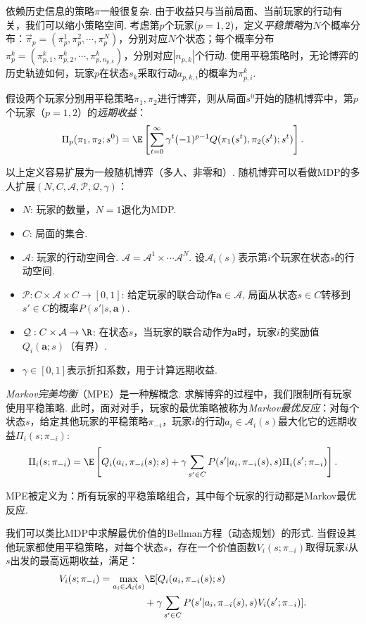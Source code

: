 依赖历史信息的策略$\pi$一般很复杂. 由于收益只与当前局面、当前玩家的行动有关，我们可以缩小策略空间. 考虑第$p$个玩家($p=1,2$)，定义\emph{平稳策略}为$N$个概率分布：$\vec \pi_p=(\pi_p^1,\pi_p^2,\cdots,\pi_p^N)$，分别对应$N$个状态；每个概率分布$\pi_p^k=(\pi_{p,1}^k,\pi_{p,2}^k,\cdots,\pi_{p,n_{p,k}}^k)$，分别对应$|n_{p,k}|$个行动. 使用平稳策略时，无论博弈的历史轨迹如何，玩家$p$在状态$s_k$采取行动$a_{p,k,i}$的概率为$\pi_{p,i}^k$.

假设两个玩家分别用平稳策略$\pi_1,\pi_2$进行博弈，则从局面$s^0$开始的随机博弈中，第$p$个玩家（$p=1,2$）的\emph{远期收益}：
        \[\Pi_p(\pi_1,\pi_2; s^0) = \E\left[\sum_{t=0}^\infty \gamma^t(-1)^{p-1} Q(\pi_1(s^t),\pi_2(s^t); {s^t}) \right].\]

以上定义容易扩展为一般随机博弈（多人、非零和）. 随机博弈可以看做MDP的多人扩展$(N, C, \mathcal A, \mathcal P,\mathcal Q, \gamma)$：
\begin{itemize}
    \item $N$: 玩家的数量，$N=1$退化为MDP.
    \item $C$: 局面的集合.
    \item $\mathcal A$: 玩家的行动空间合. $\mathcal A=\mathcal A^1\times \cdots\mathcal A^N$. 设$\mathcal A_i(s)$表示第$i$个玩家在状态$s$的行动空间.
    \item $\mathcal P: C\times \mathcal A\times C\to [0,1]$: 给定玩家的联合动作$\boldsymbol a\in\mathcal A$, 局面从状态$s\in C$转移到$s'\in C$的概率$P(s'|s,\boldsymbol a)$.
    \item $\mathcal Q: C\times \mathcal A\to \R$: 在状态$s$，当玩家的联合动作为$\boldsymbol a$时，玩家$i$的奖励值$Q_i(\boldsymbol a;s)$（有界）. 
    \item $\gamma\in[0,1]$表示折扣系数，用于计算远期收益.
\end{itemize}

\emph{Markov完美均衡}（MPE）是一种解概念. 求解博弈的过程中，我们限制所有玩家使用平稳策略. 此时，面对对手，玩家的最优策略被称为\emph{Markov最优反应}：对每个状态$s$，给定其他玩家的平稳策略$\pi_{-i}$，玩家$i$的行动$a_i\in \mathcal A_i(s)$最大化它的远期收益$\Pi_i(s;\pi_{-i})$:
    \[\Pi_i(s;\pi_{-i}) = \E\left[Q_i(a_i,\pi_{-i}(s);s) + \gamma\sum_{s'\in C} P(s'|a_i,\pi_{-i}(s),s)\Pi_i(s';\pi_{-i}) \right].\]

MPE被定义为：所有玩家的平稳策略组合，其中每个玩家的行动都是Markov最优反应. 

我们可以类比MDP中求解最优价值的Bellman方程（动态规划）的形式. 当假设其他玩家都使用平稳策略，对每个状态$s$，存在一个价值函数$V_i(s;\pi_{-i})$取得玩家$i$从$s$出发的最高远期收益，满足：
\begin{align*}
    V_i(s;\pi_{-i}) = \max_{a_i\in \mathcal A_i(s)}&\E[Q_i(a_i,\pi_{-i}(s);s) \\ &+ \gamma \sum_{s'\in C}P(s'|a_i,\pi_{-i}(s),s)V_i(s';\pi_{-i})].
\end{align*}

